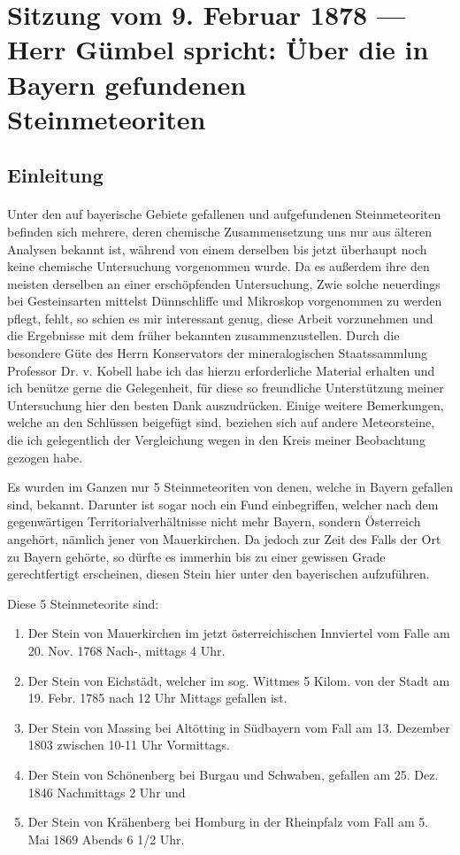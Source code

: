 \documentclass[a4paper, 11pt, oneside]{article}
\begin{document}
\section{Sitzung vom 9. Februar 1878 --- Herr Gümbel spricht: Über die in Bayern gefundenen Steinmeteoriten}
\subsection*{Einleitung}
\paragraph{}
Unter den auf bayerische Gebiete gefallenen und aufgefundenen Steinmeteoriten befinden sich mehrere, deren chemische Zusammensetzung uns nur aus älteren Analysen bekannt ist, während von einem derselben bis jetzt überhaupt noch keine chemische Untersuchung vorgenommen wurde. Da es außerdem ihre den meisten derselben an einer erschöpfenden Untersuchung, Zwie solche neuerdings bei Gesteinsarten mittelst Dünnschliffe und Mikroskop vorgenommen zu werden pflegt, fehlt, so schien es mir interessant genug, diese Arbeit vorzunehmen und die Ergebnisse mit dem früher bekannten zusammenzustellen. Durch die besondere Güte des Herrn Konservators der mineralogischen Staatssammlung Professor Dr. v. Kobell habe ich das hierzu erforderliche Material erhalten und ich benütze gerne die Gelegenheit, für diese so freundliche Unterstützung meiner Untersuchung hier den besten Dank auszudrücken. Einige weitere Bemerkungen, welche an den Schlüssen beigefügt sind, beziehen sich auf andere Meteorsteine, die ich gelegentlich der Vergleichung wegen in den Kreis meiner Beobachtung gezogen habe.

Es wurden im Ganzen nur 5 Steinmeteoriten von denen, welche in Bayern gefallen sind, bekannt. Darunter ist sogar noch ein Fund einbegriffen, welcher nach dem gegenwärtigen Territorialverhältnisse nicht mehr Bayern, sondern Österreich angehört, nämlich jener von Mauerkirchen. Da jedoch zur Zeit des Falls der Ort zu Bayern gehörte, so dürfte es immerhin bis zu einer gewissen Grade gerechtfertigt erscheinen, diesen Stein hier unter den bayerischen aufzuführen.

Diese 5 Steinmeteorite sind:
\begin{enumerate}
    \item Der Stein von Mauerkirchen im jetzt österreichischen Innviertel vom Falle am 20. Nov. 1768 Nach-, mittags 4 Uhr.
    \item Der Stein von Eichstädt, welcher im sog. Wittmes 5 Kilom. von der Stadt am 19. Febr. 1785 nach 12 Uhr Mittags gefallen ist.
    \item Der Stein von Massing bei Altötting in Südbayern vom Fall am 13. Dezember 1803 zwischen 10-11 Uhr Vormittags.
    \item Der Stein von Schönenberg bei Burgau und Schwaben, gefallen am 25. Dez. 1846 Nachmittags 2 Uhr und
    \item Der Stein von Krähenberg bei Homburg in der Rheinpfalz vom Fall am 5. Mai 1869 Abends 6 1/2 Uhr.
\end{enumerate}
\end{document}
